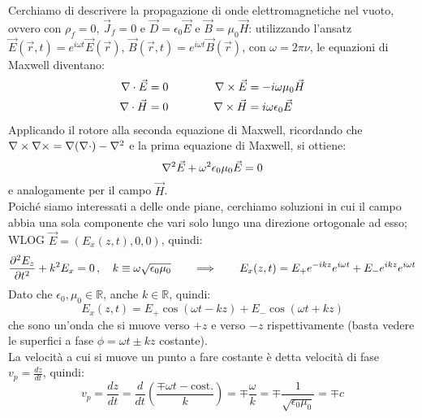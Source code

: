 Cerchiamo di descrivere la propagazione di onde elettromagnetiche nel vuoto, ovvero con $ \rho_f = 0 $, $ \vec{J}_f = 0 $ e $ \vec{D} = \epsilon_0 \vec{E} $ e $ \vec{B} = \mu_0 \vec{H} $: utilizzando l'ansatz $ \vec{E}(\vec{r}, t) = e^{i\omega t}\vec{E}(\vec{r}) $, $ \vec{B}(\vec{r}, t) = e^{i\omega t}\vec{B}(\vec{r}) $, con $ \omega = 2\pi \nu $, le equazioni di Maxwell diventano:
\begin{equation}
	\begin{split}
		\nabla\cdot\vec{E} &= 0 \\ 
		\nabla\cdot\vec{H} &= 0 
	\end{split}
	\qquad\qquad
	\begin{split}
		\nabla\times\vec{E} &= - i\omega \mu_0 \vec{H} \\ 
		\nabla\times\vec{H} &= i\omega \epsilon_0 \vec{E}
	\end{split}
	\label{eq:9}
\end{equation}
Applicando il rotore alla seconda equazione di Maxwell, ricordando che $ \nabla\times\nabla\times = \nabla(\nabla\cdot) - \nabla^2 $ e la prima equazione di Maxwell, si ottiene:
\begin{equation}
	\nabla^2\vec{E} + \omega^2 \epsilon_0 \mu_0 \vec{E} = 0
	\label{eq:10}
\end{equation}
e analogamente per il campo $ \vec{H} $. \\ 
%
Poiché siamo interessati a delle onde piane, cerchiamo soluzioni in cui il campo abbia una sola componente che vari solo lungo una direzione ortogonale ad esso; WLOG $ \vec{E} = (E_x (z,t), 0, 0) $, quindi:
\begin{equation}
	\frac{\partial^2 E_z}{\partial t^2} + k^2 E_x = 0 \,,\quad k \equiv \omega\sqrt{\epsilon_0\mu_0} \qquad\Longrightarrow\qquad E_x(z,t) = E_+ e^{-ikz}e^{i\omega t} + E_- e^{ikz} e^{i\omega t}
	\label{eq:11}
\end{equation}
Dato che $ \epsilon_0, \mu_0 \in \mathbb{R} $, anche $ k\in\mathbb{R} $, quindi:
\begin{equation}
	E_x(z,t) = E_+ \cos(\omega t - kz) + E_- \cos(\omega t + kz)
	\label{eq:12}
\end{equation}
che sono un'onda che si muove verso $ +z $ e verso $ -z $ rispettivamente (basta vedere le superfici a fase $ \phi = \omega t \pm kz $ costante). \\ 
La velocità a cui si muove un punto a fare costante è detta velocità di fase $ v_p = \frac{dz}{dt} $, quindi:
\begin{equation}
	v_p = \frac{dz}{dt} = \frac{d}{dt} \left(\frac{\mp \omega t - \text{cost.}}{k}\right) = \mp \frac{\omega}{k} = \mp \frac{1}{\sqrt{\epsilon_0\mu_0}} = \mp c
	\label{eq:13}
\end{equation}
